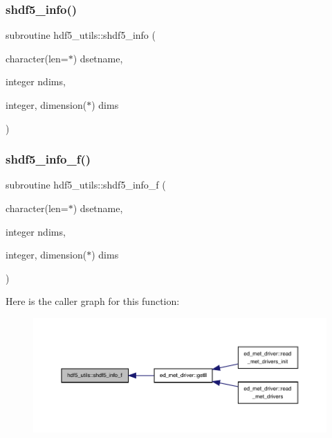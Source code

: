 \subsubsection{\texorpdfstring{shdf5\+\_\+info()}{shdf5\_info()}}
{\footnotesize\ttfamily subroutine hdf5\+\_\+utils\+::shdf5\+\_\+info (\begin{DoxyParamCaption}\item[{character(len=$\ast$)}]{dsetname,  }\item[{integer}]{ndims,  }\item[{integer, dimension($\ast$)}]{dims }\end{DoxyParamCaption})}

\mbox{\label{namespacehdf5__utils_a5149c551d73478f502b8660e3bdbd5b8}} 
\subsubsection{\texorpdfstring{shdf5\+\_\+info\+\_\+f()}{shdf5\_info\_f()}}
{\footnotesize\ttfamily subroutine hdf5\+\_\+utils\+::shdf5\+\_\+info\+\_\+f (\begin{DoxyParamCaption}\item[{character(len=$\ast$)}]{dsetname,  }\item[{integer}]{ndims,  }\item[{integer, dimension($\ast$)}]{dims }\end{DoxyParamCaption})}

Here is the caller graph for this function\+:
\nopagebreak
\begin{figure}[H]
\begin{center}
\leavevmode
\includegraphics[width=350pt]{namespacehdf5__utils_a5149c551d73478f502b8660e3bdbd5b8_icgraph}
\end{center}
\end{figure}
\mbox{\label{namespacehdf5__utils_ab26ed9a2b6aaa85020cd040ea3b049fc}} 
